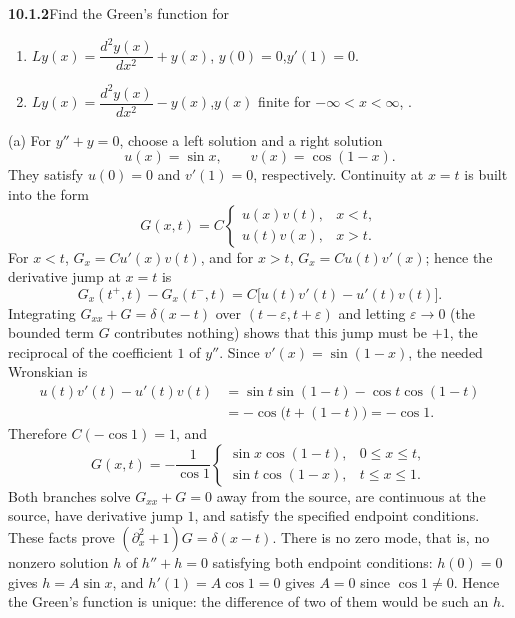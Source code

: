 \par\bigskip
\noindent\textbf{10.1.2}\quad Find the Green's function for
\begin{enumerate}
\item[(a)] $Ly(x)=\dfrac{d^{2}y(x)}{dx^{2}}+y(x)$,\quad
  $y(0)=0$,\quad$y'(1)=0$.
\item[(b)] $Ly(x)=\dfrac{d^{2}y(x)}{dx^{2}}-y(x)$,\quad$y(x)$ finite for
  $-\infty<x<\infty$, .
\end{enumerate}
\solution
(a) For $y''+y=0$, choose a left solution and a right solution
\[
u(x)=\sin x,\qquad v(x)=\cos(1-x).
\]
They satisfy $u(0)=0$ and $v'(1)=0$, respectively. Continuity at $x=t$
is built into the form
\[
G(x,t)=C\begin{cases}u(x)v(t),&x<t,\\u(t)v(x),&x>t.\end{cases}
\]
For $x<t$, $G_x=Cu'(x)v(t)$, and for $x>t$, $G_x=Cu(t)v'(x)$; hence
the derivative jump at $x=t$ is
\[
G_x(t^+,t)-G_x(t^-,t)=C\bigl[u(t)v'(t)-u'(t)v(t)\bigr].
\]
Integrating $G_{xx}+G=\delta(x-t)$ over $(t-\varepsilon,t+\varepsilon)$
and letting $\varepsilon\to0$ (the bounded term $G$ contributes nothing)
shows that this jump must be $+1$, the reciprocal of the coefficient
$1$ of $y''$. Since $v'(x)=\sin(1-x)$, the needed Wronskian is
\begin{align*}
u(t)v'(t)-u'(t)v(t)
&=\sin t\sin(1-t)-\cos t\cos(1-t)\\
&=-\cos\bigl(t+(1-t)\bigr)=-\cos1.
\end{align*}
Therefore $C(-\cos1)=1$, and
\[
\boxed{G(x,t)=-\frac1{\cos1}
\begin{cases}
\sin x\cos(1-t),&0\le x\le t,\\
\sin t\cos(1-x),&t\le x\le1.
\end{cases}}
\]
Both branches solve $G_{xx}+G=0$ away from the source, are continuous
at the source, have derivative jump $1$, and satisfy the specified
endpoint conditions. These facts prove $(\partial_x^2+1)G=\delta(x-t)$.
There is no zero mode, that is, no nonzero solution $h$ of $h''+h=0$
satisfying both endpoint conditions: $h(0)=0$ gives $h=A\sin x$, and
$h'(1)=A\cos1=0$ gives $A=0$ since $\cos1\ne0$. Hence the Green's
function is unique: the difference of two of them would be such an $h$.

